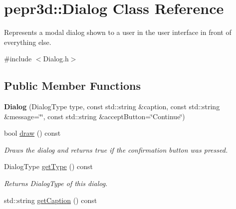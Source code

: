 \hypertarget{classpepr3d_1_1_dialog}{}\section{pepr3d\+::Dialog Class Reference}
\label{classpepr3d_1_1_dialog}


Represents a modal dialog shown to a user in the user interface in front of everything else.  




{\ttfamily \#include $<$Dialog.\+h$>$}

\subsection*{Public Member Functions}
\begin{DoxyCompactItemize}
\item 
\mbox{\label{classpepr3d_1_1_dialog_a76e84fe63c48e1598340732b4973e051}} 
{\bfseries Dialog} (Dialog\+Type type, const std\+::string \&caption, const std\+::string \&message=\char`\"{}\char`\"{}, const std\+::string \&accept\+Button=\char`\"{}Continue\char`\"{})
\item 
\mbox{\label{classpepr3d_1_1_dialog_a45181133f311f1f19c30242b18d69e74}} 
bool \mbox{\hyperlink{classpepr3d_1_1_dialog_a45181133f311f1f19c30242b18d69e74}{draw}} () const
\begin{DoxyCompactList}\small\item\em Draws the dialog and returns true if the confirmation button was pressed. \end{DoxyCompactList}\item 
\mbox{\label{classpepr3d_1_1_dialog_a3634fe3a89e32eeb2758cabf556e8f86}} 
Dialog\+Type \mbox{\hyperlink{classpepr3d_1_1_dialog_a3634fe3a89e32eeb2758cabf556e8f86}{get\+Type}} () const
\begin{DoxyCompactList}\small\item\em Returns Dialog\+Type of this dialog. \end{DoxyCompactList}\item 
\mbox{\label{classpepr3d_1_1_dialog_a176eac0bbf832b8688ebbd9f62c75bc0}} 
std\+::string \mbox{\hyperlink{classpepr3d_1_1_dialog_a176eac0bbf832b8688ebbd9f62c75bc0}{get\+Caption}} () const

\end{DoxyCompactItemize}
